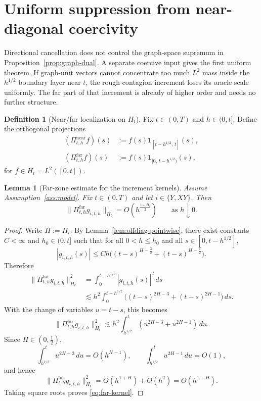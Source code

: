 \documentclass[11pt,a4paper]{amsart}
\theoremstyle{plain}
\newtheorem{lemma}[theorem]{Lemma}
\theoremstyle{definition}
\newtheorem{definition}[theorem]{Definition}
\theoremstyle{remark}
\newcommand{\one}{\mathbf 1}
\begin{document}
\section{Uniform suppression from near-diagonal coercivity}\label{sec:uniform}

Directional cancellation does not control the graph-space supremum in
Proposition~\ref{prop:graph-dual}.  A separate coercive input gives the first uniform theorem.  If
graph-unit vectors cannot concentrate too much \(L^2\) mass inside the \(h^{1/2}\) boundary layer
near \(t\), the rough contagion increment loses its oracle scale uniformly.  The far part of that
increment is already of higher order and needs no further structure.

\begin{definition}[Near/far localization on $H_t$]\label{def:near-far}
Fix $t\in(0,T)$ and $h\in(0,t]$. Define the orthogonal projections
\begin{align}
(\Pi_{t,h}^{\mathrm{near}}f)(s)
&:=
f(s)\one_{[t-h^{1/2},\,t]}(s), \label{eq:Pi-near}\\
(\Pi_{t,h}^{\mathrm{far}}f)(s)
&:=
f(s)\one_{[0,\,t-h^{1/2})}(s), \label{eq:Pi-far}
\end{align}
for $f\in H_t=L^2([0,t])$.
\end{definition}

\begin{lemma}[Far-zone estimate for the increment kernels]\label{lem:far-kernel}
Assume Assumption~\ref{ass:model}. Fix $t\in(0,T)$ and let $i\in\{Y,XY\}$. Then
\begin{equation}\label{eq:far-kernel}
\|\Pi_{t,h}^{\mathrm{far}}g_{i,t,h}\|_{H_t}
=
O(h^{\frac{1+H_i}{2}})
\qquad\text{as }h\downarrow0.
\end{equation}
\end{lemma}

\begin{proof}
Write $H:=H_i$. By Lemma~\ref{lem:offdiag-pointwise}, there exist
constants $C<\infty$ and $h_0\in(0,t]$ such that for all $0<h\le h_0$ and all
$s\in[0,t-h^{1/2}]$,
\[
|g_{i,t,h}(s)|
\le
Ch\bigl((t-s)^{H-\frac32}+(t-s)^{H-\frac12}\bigr).
\]
Therefore
\begin{align*}
\|\Pi_{t,h}^{\mathrm{far}}g_{i,t,h}\|_{H_t}^2
&=
\int_0^{t-h^{1/2}} |g_{i,t,h}(s)|^2\,ds \\
&\lesssim
h^2\int_0^{t-h^{1/2}}
\bigl((t-s)^{2H-3}+(t-s)^{2H-1}\bigr)\,ds.
\end{align*}
With the change of variables $u=t-s$, this becomes
\[
\|\Pi_{t,h}^{\mathrm{far}}g_{i,t,h}\|_{H_t}^2
\lesssim
h^2\int_{h^{1/2}}^t (u^{2H-3}+u^{2H-1})\,du.
\]
Since $H\in(0,\tfrac12)$,
\[
\int_{h^{1/2}}^t u^{2H-3}\,du = O(h^{H-1}),
\qquad
\int_{h^{1/2}}^t u^{2H-1}\,du = O(1),
\]
and hence
\[
\|\Pi_{t,h}^{\mathrm{far}}g_{i,t,h}\|_{H_t}^2
=
O(h^{1+H})+O(h^2)
=
O(h^{1+H}).
\]
Taking square roots proves \eqref{eq:far-kernel}.
\end{proof}
\end{document}
